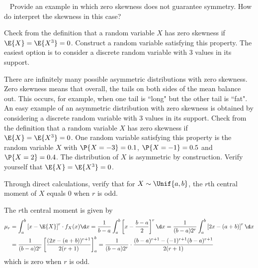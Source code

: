 	\begin{exercise}~
		Provide an example in which zero skewness does not guarantee symmetry. How do interpret the skewness in this case?
		\begin{hint}
			Check from the definition that a random variable $X$ has zero skewness if $\E{X} = \E{X^3} = 0$. Construct a random variable satisfying this property. The easiest option is to consider a discrete random variable with 3 values in its support.
		\end{hint}
		\begin{solution}
			There are infinitely many possible asymmetric distributions with zero skewness. Zero skewness means that overall, the tails on both sides of the mean balance out. This occurs, for example, when one tail is ``long" but the other tail is ``fat". An easy example of an asymmetric distribution with zero skewness is obtained by considering a discrete random variable with 3 values in its support. Check from the definition that a random variable $X$ has zero skewness if $\E{X} = \E{X^3} = 0$. One random variable satisfying this property is the random variable $X$ with $\P{X = -3} = 0.1$, $\P{X = -1} = 0.5$ and $\P{X = 2} = 0.4$. The distribution of $X$ is asymmetric by construction. Verify yourself that $\E{X} = \E{X^3} = 0$.
		\end{solution}
	\end{exercise}
	
	\begin{exercise}
		Through direct calculations, verify that for $X \sim \Unif{a, b}$, the $r$th central moment of $X$ equals $0$ when $r$ is odd.
		\begin{solution}
			The $r$th central moment is given by
			\begin{align*}
				\mu_r & = \int_a^b \left[x - \E{X}\right]^r \cdot f_X(x) \d x = \frac{1}{b - a} \int_a^b \left[x - \frac{b - a}{2}\right]^r \d x = \frac{1}{(b - a) 2^r} \int_a^b \left[2x - (a + b)\right]^r \d x \\
				&= \frac{1}{(b - a) 2^r} \left[\frac{(2x - (a + b))^{r + 1}}{2(r + 1)}\right]_a^b = \frac{1}{(b - a) 2^r} \cdot \frac{(b - a)^{r + 1} - (-1)^{r + 1} (b - a)^{r + 1}}{2(r + 1)}
			\end{align*}
			which is zero when $r$ is odd.
		\end{solution}
	\end{exercise}
	
